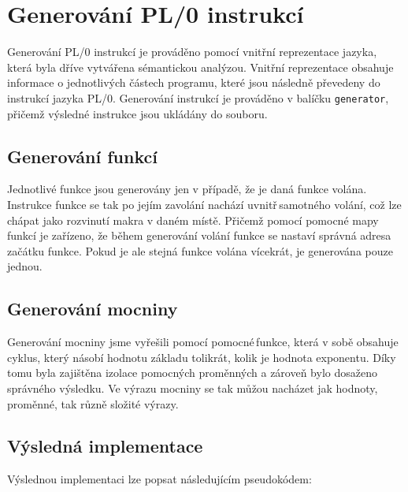 \documentclass[czech, oth, kiv, he, iso690numb, viewonly]{fasthesis}
\begin{document}
    \pagebreak

    \section{Generování PL/0 instrukcí}

    Generování PL/0 instrukcí je prováděno pomocí vnitřní reprezentace jazyka, která byla dříve vytvářena sémantickou analýzou.
    Vnitřní reprezentace obsahuje informace o jednotlivých částech programu, které jsou následně převedeny do instrukcí jazyka PL/0.
    Generování instrukcí je prováděno v balíčku \texttt{generator}, přičemž výsledné instrukce jsou ukládány do souboru.

    \subsection{Generování funkcí}

    Jednotlivé funkce jsou generovány jen v případě, že je daná funkce volána.
    Instrukce funkce se tak po jejím zavolání nachází \glqq uvnitř\grqq \,samotného volání, což lze chápat jako rozvinutí makra v daném místě.
    Přičemž pomocí pomocné mapy funkcí je zařízeno, že během generování volání funkce se nastaví správná adresa začátku funkce.
    Pokud je ale stejná funkce volána vícekrát, je generována pouze jednou.

    \subsection{Generování mocniny}

    Generování mocniny jsme vyřešili pomocí \glqq pomocné\grqq \,funkce, která v sobě obsahuje cyklus, který násobí hodnotu základu tolikrát, kolik je hodnota exponentu.
    Díky tomu byla zajištěna izolace pomocných proměnných a zároveň bylo dosaženo správného výsledku.
    Ve výrazu mocniny se tak můžou nacházet jak hodnoty, proměnné, tak různě složité výrazy.

    \pagebreak

    \subsection{Výsledná implementace}

    Výslednou implementaci lze popsat následujícím pseudokódem:
\end{document}
